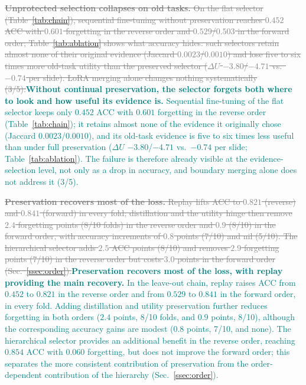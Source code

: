 \documentclass{article}
\newif\ifmarkup \markuptrue
\newcommand{\repc}[3]{\ifmarkup\textcolor{gray}{\sout{#2}}\textcolor{#1}{#3}\else#3\fi}
\newcommand{\repG}[2]{\repc{teal}{#1}{#2}}    %
\begin{document}
\repG{\textbf{Unprotected selection collapses on old tasks.} On the flat selector (Table~\ref{tab:chain}), sequential fine-tuning without preservation reaches $0.452$ ACC with $0.601$ forgetting in the reverse order and $0.529$/$0.503$ in the forward order; Table~\ref{tab:ablation} shows what accuracy hides: such selectors retain almost none of their original evidence (Jaccard $0.0023$/$0.0010$) and lose five to six times more old-task utility than the preserved selector ($\Delta U$ $-3.80$/$-4.71$ vs.\ $-0.74$ per slide). LoRA merging alone changes nothing systematically (3/5).}{\textbf{Without continual preservation, the selector forgets both where to look and how useful its evidence is.} Sequential fine-tuning of the flat selector keeps only $0.452$ ACC with $0.601$ forgetting in the reverse order (Table~\ref{tab:chain}); it retains almost none of the evidence it originally chose (Jaccard $0.0023$/$0.0010$), and its old-task evidence is five to six times less useful than under full preservation ($\Delta U$ $-3.80$/$-4.71$ vs.\ $-0.74$ per slide; Table~\ref{tab:ablation}). The failure is therefore already visible at the evidence-selection level, not only as a drop in accuracy, and boundary merging alone does not address it (3/5).}

\repG{\textbf{Preservation recovers most of the loss.} Replay lifts ACC to $0.821$ (reverse) and $0.841$ (forward) in every fold; distillation and the utility hinge then remove $2.4$ forgetting points (8/10 folds) in the reverse order and $0.9$ (8/10) in the forward order, with accuracy increments of $0.8$ points (7/10) and nil (5/10). The hierarchical selector adds $2.5$ ACC points (8/10) and removes $2.9$ forgetting points (7/10) in the reverse order but costs $3.0$ points in the forward order (Sec.~\ref{ssec:order}).}{\textbf{Preservation recovers most of the loss, with replay providing the main recovery.} In the leave-out chain, replay raises ACC from $0.452$ to $0.821$ in the reverse order and from $0.529$ to $0.841$ in the forward order, in every fold. Adding distillation and utility preservation further reduces forgetting in both orders ($2.4$ points, 8/10 folds, and $0.9$ points, 8/10), although the corresponding accuracy gains are modest ($0.8$ points, 7/10, and none). The hierarchical selector provides an additional benefit in the reverse order, reaching $0.854$ ACC with $0.060$ forgetting, but does not improve the forward order; this separates the more consistent contribution of preservation from the order-dependent contribution of the hierarchy (Sec.~\ref{ssec:order}).}
\end{document}
